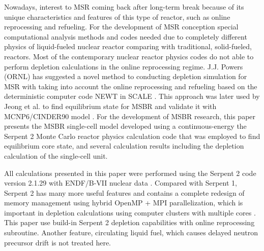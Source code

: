 \documentclass{anstrans}
\begin{document}
Nowadays, interest to \gls{MSR} coming back after long-term break because of its unique characteristics and features of this type of reactor, such as online reprocessing and refueling. For the development of \gls{MSR} conception special computational analysis methods and codes needed due to completely different physics of liquid-fueled nuclear reactor comparing with traditional, solid-fueled, reactors. Most of the contemporary nuclear reactor physics codes do not able to perform depletion calculations in the online reprocessing regime. J.J. Powers (\gls{ORNL}) has suggested a novel method to conducting depletion simulation for \gls{MSR} with taking into account the online reprocessing and refueling based on the deterministic computer code NEWT in SCALE \cite{powers_new_2013}. This approach was later used by Jeong et al. to find equilibrium state for MSBR and validate it with MCNP6/CINDER90 model \cite{jeong_equilibrium_2016}. For the development of MSBR research, this paper presents the MSBR single-cell model developed using a continuous-energy the Serpent 2 Monte Carlo reactor physics calculation code that was employed to find equilibrium core state, and several calculation results including the depletion calculation of the single-cell unit.

All calculations presented in this paper were performed using the Serpent 2 code version 2.1.29 with ENDF/B-VII
nuclear data \cite{leppanen_serpent_2012,chadwick_endf/b-vii.0:_2006}. Compared with Serpent 1, Serpent 2 has many more useful features and contains a complete redesign of memory management using hybrid OpenMP + MPI parallelization, which is important in depletion calculations using computer clusters with multiple cores \cite{leppanen_serpent_2015}. This paper use build-in Serpent 2 depletion capabilities with online reprocessing subroutine. Another feature, circulating
liquid fuel, which causes delayed neutron precursor drift is not treated here.

\end{document}
